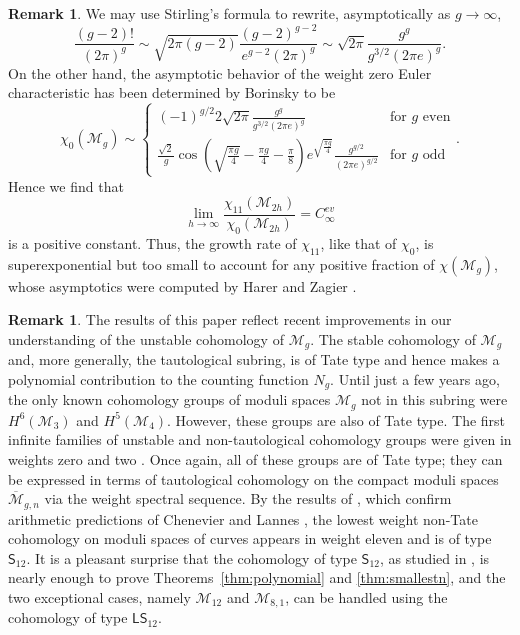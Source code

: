 \documentclass[12pt]{amsart}
\theoremstyle{definition}
\newtheorem{rem}[thm]{Remark}
\numberwithin{equation}{section}
\newcommand{\M}{\mathcal{M}}
\newcommand{\ocM}{\overline{\mathcal{M}}}
\newcommand{\cM}{\mathcal{M}}
\newcommand{\lstw}{\mathsf{L}\mathsf{S}_{12}}
\theoremstyle{definition} %
\theoremstyle{remark}
\begin{document}
\begin{rem}
We may use Stirling's formula to rewrite, asymptotically as $g\to \infty$,
\[
\frac{(g-2)!}{(2\pi)^g}
\sim 
\sqrt{2\pi(g-2)}
\frac{(g-2)^{g-2} }{ e^{g-2} (2\pi)^g}
\sim 
  \sqrt{2\pi}  \frac{g^g}{g^{3/2}(2\pi e)^g}.
\]
On the other hand, the asymptotic behavior of the weight zero Euler characteristic has been determined by Borinsky \cite{Borinsky} to be 
\[
\chi_0(\M_g) 
\sim 
\begin{cases}
 (-1)^{g/2} 2\sqrt{2\pi} \frac{g^g}{g^{3/2}(2\pi e)^g}   & \text{for $g$ even} \\
 \frac{\sqrt{2}}{g} 
 \cos\left( \sqrt{\frac{\pi g}{4}} -\frac{\pi g}{4}-\frac{\pi}8 \right)
 e^{\sqrt{\frac{\pi g}{4}}} 
 \frac{g^{g/2}}{(2\pi e)^{g/2}}
 & \text{for $g$ odd} 
\end{cases}.
\]
Hence we find that 
\[
\lim_{h\to\infty} \frac{\chi_{11}(\M_{2h})}{\chi_{0}(\M_{2h})}
=
C_\infty^{ev}
\]
is a positive constant. Thus, the growth rate of $\chi_{11}$, like that of $\chi_0$, is superexponential but too small to account for any positive fraction of $\chi(\cM_g)$, whose asymptotics were computed by Harer and Zagier  \cite{HarerZagier}.
\end{rem}

\begin{rem} The results of this paper reflect recent improvements in our understanding of the unstable cohomology of $\M_g$. The stable cohomology of $\M_g$ and, more generally, the tautological subring, is of Tate type and hence makes a polynomial contribution to the counting function $N_g$.  Until just a few years ago, the only known cohomology groups of moduli spaces $\M_g$ not in this subring were $H^6(\M_3)$ and $H^5(\M_4)$. However, these groups are also of Tate type. The first infinite families of unstable and non-tautological cohomology groups were given in weights zero and two \cite{CGP21, PayneWillwacher24b}. Once again, all of these groups are of Tate type; they can be expressed in terms of tautological cohomology on the compact moduli spaces $\ocM_{g,n}$ via the weight spectral sequence.  By the results of \cite{BergstromFaberPayne, CanningLarsonPayne}, which confirm arithmetic predictions of Chenevier and Lannes \cite{ChenevierLannes}, the lowest weight non-Tate cohomology on moduli spaces of curves appears in weight eleven and is of type $\mathsf{S}_{12}$.  It is a pleasant surprise that the cohomology of type $\mathsf{S}_{12}$, as studied in \cite{PayneWillwacher24}, is nearly enough to prove Theorems~\ref{thm:polynomial} and \ref{thm:smallestn}, and the two exceptional cases, namely $\cM_{12}$ and $\cM_{8,1}$, can be handled using the cohomology of type $\lstw$.
\end{rem}
\end{document}

